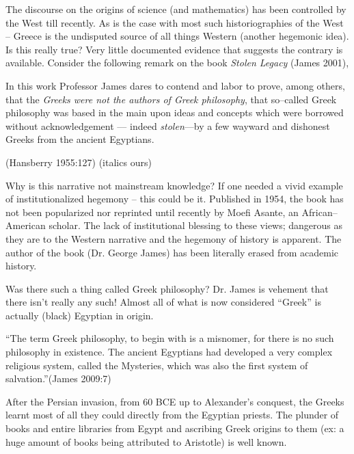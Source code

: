 The discourse on the origins of science (and mathematics) has been controlled by the West till recently. As is the case with most such historiographies of the West – Greece is the undisputed source of all things Western (another hegemonic idea). Is this really true? Very little documented evidence that suggests the contrary is available. Consider the following remark on the book \textit{Stolen Legacy} (James 2001),

\begin{myquote}
In this work Professor James dares to contend and labor to prove, among others, that the \textit{Greeks were not the authors of Greek philosophy}, that so–called Greek philosophy was based in the main upon ideas and concepts which were borrowed without acknowledgement –– indeed \textit{stolen}––by a few wayward and dishonest Greeks from the ancient Egyptians.
\end{myquote}

\hfill (Hansberry 1955:127) (italics ours)

Why is this narrative not mainstream knowledge? If one needed a vivid example of institutionalized hegemony – this could be it. Published in 1954, the book has not been popularized nor reprinted until recently by Moefi Asante, an African–American scholar. The lack of institutional blessing to these views; dangerous as they are to the Western narrative and the hegemony of history is apparent. The author of the book (Dr. George James) has been literally erased from academic history.

Was there such a thing called Greek philosophy? Dr. James is vehement that there isn’t really any such! Almost all of what is now considered “Greek” is actually (black) Egyptian in origin.

\begin{myquote}
“The term Greek philosophy, to begin with is a misnomer, for there is no such philosophy in existence. The ancient Egyptians had developed a very complex religious system, called the Mysteries, which was also the first system of salvation.”\hfill (James 2009:7)
\end{myquote}

After the Persian invasion, from 60 BCE up to Alexander’s conquest, the Greeks learnt most of all they could directly from the Egyptian priests. The plunder of books and entire libraries from Egypt and ascribing Greek origins to them (ex: a huge amount of books being attributed to Aristotle) is well known.

